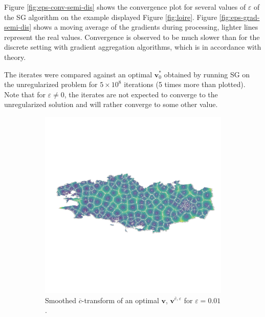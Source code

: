 Figure \ref{fig:eps-conv-semi-dis} shows the convergence plot for several values of $\varepsilon$ of the SG algorithm on the example displayed Figure \ref{fig:loire}. Figure \ref{fig:eps-grad-semi-dis} shows a moving average of the gradients during processing, lighter lines represent the real values.
Convergence is observed to be much slower than for the discrete setting with gradient aggregation algorithms, which is in accordance with theory. 

The iterates were compared against an optimal $\bm{v}_0^*$ obtained by running SG on the unregularized problem for $5\times 10^8$ iterations (5 times more than plotted).
Note that for $\varepsilon \neq 0$, the iterates are not expected to converge to the unregularized solution and will rather converge to some other value.

\begin{figure}[h]
    \centering
    \begin{subfigure}{.35\linewidth}
        \centering
        \includegraphics[width=\linewidth]{figures/opti_rennes.pdf}
        \caption{Smoothed $\overline{c}$-transform of an optimal $\bm{v}$, $\bm{v}^{\overline{c}, \varepsilon}$ for $\varepsilon = 0.01$.}
    \end{subfigure}
    \begin{subfigure}{.35\linewidth}
        \centering

\end{subfigure}
\end{figure}
